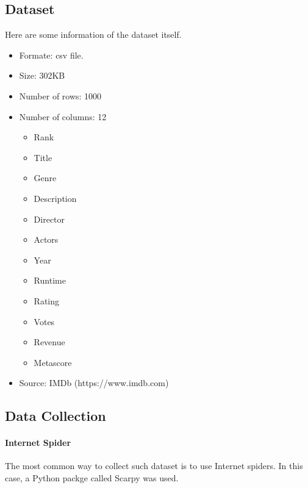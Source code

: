 \documentclass{article}
\begin{document}
\begin{CJK}{UTF8}{gbsn}
            \subsection{Dataset}
            Here are some information of the dataset itself.
            \begin{itemize}
                \item Formate: csv file.
                \item Size: 302KB
                \item Number of rows: 1000
                \item Number of columns: 12
                \begin{itemize}
                    \item Rank
                    \item Title
                    \item Genre
                    \item Description
                    \item Director
                    \item Actors
                    \item Year
                    \item Runtime
                    \item Rating
                    \item Votes
                    \item Revenue
                    \item Metascore
                \end{itemize}
                \item Source: IMDb (https://www.imdb.com)
            \end{itemize}
            \subsection{Data Collection}
            \paragraph{Internet Spider}
            The most common way to collect such dataset is to use Internet spiders. In this case, a Python packge called Scarpy was used. 
    \end{CJK}
    
\end{document}
